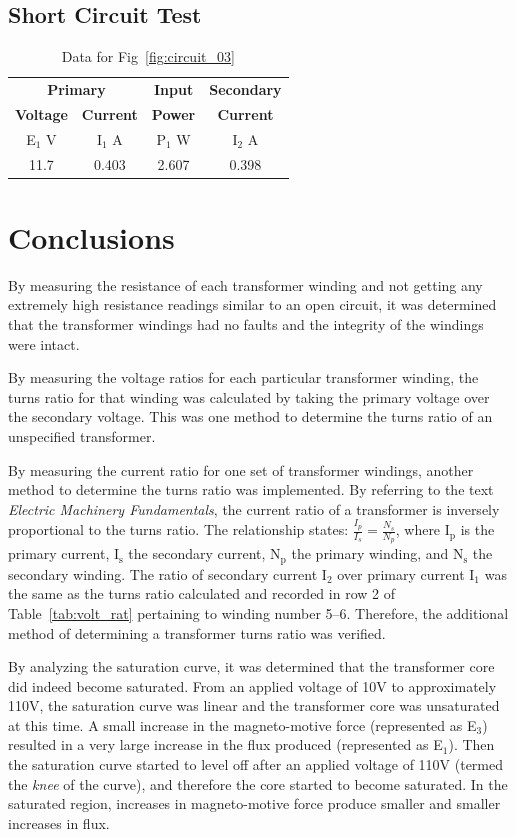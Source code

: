 \documentclass{article}
\begin{document}
\subsection{Short Circuit Test}
\begin{table}[H]
  \centering
  \begin{tabular}{*{4}{c}}
    \multicolumn{2}{c}{\textbf{Primary}} & \textbf{Input} & \textbf{Secondary} \\
    \textbf{Voltage} & \textbf{Current} & \textbf{Power} & \textbf{Current} \\
    E$_1$ V & I$_1$ A & P$_1$ W & I$_2$ A \\
    \hline
    11.7 & 0.403 & 2.607 & 0.398 \\
  \end{tabular}
  \caption{Data for Fig~\ref{fig:circuit_03}}
  \label{tab:short_circ}
\end{table}

\section{Conclusions}

By measuring the resistance of each transformer winding and not getting any
extremely high resistance readings similar to an open circuit, it was
determined that the transformer windings had no faults and the integrity of the
windings were intact.

By measuring the voltage ratios for each particular transformer winding, the
turns ratio for that winding was calculated by taking the primary voltage over
the secondary voltage. This was one method to determine the turns ratio of an
unspecified transformer.

By measuring the current ratio for one set of transformer windings, another
method to determine the turns ratio was implemented. By referring to the text
\emph{Electric Machinery Fundamentals}, the current ratio of a transformer is
inversely proportional to the turns ratio. The relationship states:
$\frac{I_p}{I_s} = \frac{N_s}{N_p}$, where I$_\text{p}$ is the primary current,
I$_\text{s}$ the secondary current, N$_\text{p}$ the primary winding, and
N$_\text{s}$ the secondary winding.  The ratio of secondary current I$_2$ over
primary current I$_1$ was the same as the turns ratio calculated and recorded
in row 2 of Table~\ref{tab:volt_rat} pertaining to winding number 5--6.
Therefore, the additional method of determining a transformer turns ratio was
verified.

By analyzing the saturation curve, it was determined that the transformer core
did indeed become saturated.  From an applied voltage of 10V to approximately
110V, the saturation curve was linear and the transformer core was unsaturated
at this time. A small increase in the magneto-motive force (represented as
E$_3$) resulted in a very large increase in the flux produced (represented as
E$_1$).  Then the saturation curve started to level off after an applied
voltage of 110V (termed the \emph{knee} of the curve), and therefore the core
started to become saturated. In the saturated region, increases in
magneto-motive force produce smaller and smaller increases in flux.
\end{document}
